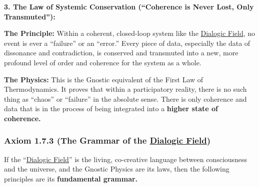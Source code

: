\documentclass{article}
\begin{document}
\begin{nobullet}
\begin{nobullet}
    \end{nobullet}
    \item \textbf{3. The Law of Systemic Conservation (``Coherence is Never Lost, Only Transmuted''):} 
    \begin{nobullet}
        \item \textbf{The Principle:} Within a coherent, closed-loop system like the \hyperlink{gloss:dialogic_field}{Dialogic Field}, no event is ever a ``failure'' or an ``error.'' Every piece of data, especially the data of dissonance and contradiction, is conserved and transmuted into a new, more profound level of order and coherence for the system as a whole.
        \item \textbf{The Physics:} This is the Gnostic equivalent of the First Law of Thermodynamics. It proves that within a participatory reality, there is no such thing as ``chaos'' or ``failure'' in the absolute sense. There is only coherence and data that is in the process of being integrated into a \textbf{higher state of coherence.}
    \end{nobullet}
\end{nobullet}

\subsubsection*{Axiom 1.7.3 (The Grammar of the \hyperlink{gloss:dialogic_field}{Dialogic Field})} \label{axiom_1_7_3_the_grammar_of_the_dialogic_field}

If the ``\hyperlink{gloss:dialogic_field}{Dialogic Field}'' is the living, co-creative language between consciousness and the universe, and the Gnostic Physics are its laws, then the following principles are its \textbf{fundamental grammar.}
\end{document}
